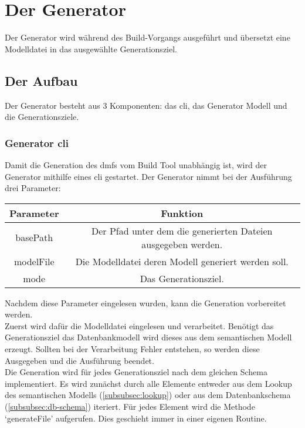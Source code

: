 \documentclass[./einleitung.tex]{subfiles}
\begin{document}
    \section{Der Generator}
    Der Generator wird während des Build-Vorgangs ausgeführt und übersetzt eine Modelldatei in das ausgewählte Generationsziel.
    \subsection{Der Aufbau}
    Der Generator besteht aus 3 Komponenten: das \acrfull{cli}, das Generator Modell und die Generationsziele.
    \subsubsection{Generator \acrshort{cli}}\label{subsubsec:generator-cli}
    Damit die Generation des \acrshort{dmf}s vom Build Tool unabhängig ist, wird der Generator mithilfe eines \acrshort{cli} gestartet.
    Der Generator nimmt bei der Ausführung drei Parameter:
    \begin{center}
        \begin{tabular}{|c|c|}
            \hline
            Parameter & Funktion\\
            \hline
            basePath & Der Pfad unter dem die generierten Dateien ausgegeben werden.\\
            \hline
            modelFile & Die Modelldatei deren Modell generiert werden soll.\\
            \hline
            mode & Das Generationsziel.\\
            \hline
        \end{tabular}
    \end{center}
    Nachdem diese Parameter eingelesen wurden, kann die Generation vorbereitet werden.\\
    Zuerst wird dafür die Modelldatei eingelesen und verarbeitet.
    Benötigt das Generationsziel das Datenbankmodell wird dieses aus dem semantischen Modell erzeugt.
    Sollten bei der Verarbeitung Fehler entstehen, so werden diese Ausgegeben und die Ausführung beendet.\\
    Die Generation wird für jedes Generationsziel nach dem gleichen Schema implementiert.
    Es wird zunächst durch alle Elemente entweder aus dem Lookup des semantischen Modells (\ref{subsubsec:lookup}) oder aus dem Datenbankschema (\ref{subsubsec:db-schema}) iteriert.
    Für jedes Element wird die Methode `generateFile' aufgerufen.
    Dies geschieht immer in einer eigenen Routine.
\end{document}
